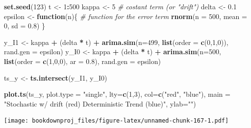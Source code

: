 \documentclass[
]{article}
\newenvironment{Shaded}{\begin{snugshade}}{\end{snugshade}}
\newcommand{\CommentTok}[1]{\textcolor[rgb]{0.56,0.35,0.01}{\textit{#1}}}
\newcommand{\ControlFlowTok}[1]{\textcolor[rgb]{0.13,0.29,0.53}{\textbf{#1}}}
\newcommand{\DataTypeTok}[1]{\textcolor[rgb]{0.13,0.29,0.53}{#1}}
\newcommand{\DecValTok}[1]{\textcolor[rgb]{0.00,0.00,0.81}{#1}}
\newcommand{\FloatTok}[1]{\textcolor[rgb]{0.00,0.00,0.81}{#1}}
\newcommand{\KeywordTok}[1]{\textcolor[rgb]{0.13,0.29,0.53}{\textbf{#1}}}
\newcommand{\NormalTok}[1]{#1}
\newcommand{\OperatorTok}[1]{\textcolor[rgb]{0.81,0.36,0.00}{\textbf{#1}}}
\newcommand{\StringTok}[1]{\textcolor[rgb]{0.31,0.60,0.02}{#1}}
\begin{document}
\begin{Shaded}
\begin{Highlighting}[]
\KeywordTok{set.seed}\NormalTok{(}\DecValTok{123}\NormalTok{)}
\NormalTok{t <-}\StringTok{ }\DecValTok{1}\OperatorTok{:}\DecValTok{500} 
\NormalTok{kappa <-}\StringTok{ }\DecValTok{5} \CommentTok{# costant term (or "drift")}
\NormalTok{delta <-}\StringTok{ }\FloatTok{0.1} 
\NormalTok{epsilon <-}\StringTok{ }\ControlFlowTok{function}\NormalTok{(n)\{ }\CommentTok{# function for the error term}
    \KeywordTok{rnorm}\NormalTok{(}\DataTypeTok{n =} \DecValTok{500}\NormalTok{, }\DataTypeTok{mean =} \DecValTok{0}\NormalTok{, }\DataTypeTok{sd =} \FloatTok{0.8}\NormalTok{)}
\NormalTok{    \} }

\NormalTok{y_I1 <-}\StringTok{ }\NormalTok{kappa }\OperatorTok{+}\StringTok{ }\NormalTok{(delta }\OperatorTok{*}\StringTok{ }\NormalTok{t) }\OperatorTok{+}\StringTok{ }\KeywordTok{arima.sim}\NormalTok{(}\DataTypeTok{n=}\DecValTok{499}\NormalTok{, }\KeywordTok{list}\NormalTok{(}\DataTypeTok{order =} \KeywordTok{c}\NormalTok{(}\DecValTok{0}\NormalTok{,}\DecValTok{1}\NormalTok{,}\DecValTok{0}\NormalTok{)), }
                                        \DataTypeTok{rand.gen =}\NormalTok{ epsilon)}
\NormalTok{y_I0 <-}\StringTok{ }\NormalTok{kappa }\OperatorTok{+}\StringTok{ }\NormalTok{(delta }\OperatorTok{*}\StringTok{ }\NormalTok{t) }\OperatorTok{+}\StringTok{ }\KeywordTok{arima.sim}\NormalTok{(}\DataTypeTok{n=}\DecValTok{500}\NormalTok{, }\KeywordTok{list}\NormalTok{(}\DataTypeTok{order =} \KeywordTok{c}\NormalTok{(}\DecValTok{1}\NormalTok{,}\DecValTok{0}\NormalTok{,}\DecValTok{0}\NormalTok{), }\DataTypeTok{ar =} \FloatTok{0.8}\NormalTok{),}
                                        \DataTypeTok{rand.gen =}\NormalTok{ epsilon)}

\NormalTok{ts_y <-}\StringTok{ }\KeywordTok{ts.intersect}\NormalTok{(y_I1, y_I0)}

\KeywordTok{plot.ts}\NormalTok{(ts_y, }\DataTypeTok{plot.type =} \StringTok{"single"}\NormalTok{, }
        \DataTypeTok{lty=}\KeywordTok{c}\NormalTok{(}\DecValTok{1}\NormalTok{,}\DecValTok{3}\NormalTok{), }\DataTypeTok{col=}\KeywordTok{c}\NormalTok{(}\StringTok{"red"}\NormalTok{, }\StringTok{"blue"}\NormalTok{),}
        \DataTypeTok{main =} \StringTok{"Stochastic w/ drift (red) Deterministic Trend (blue)"}\NormalTok{,}
        \DataTypeTok{ylab=}\StringTok{""}\NormalTok{)}
\end{Highlighting}
\end{Shaded}

\texttt{[image: bookdownproj\_files/figure-latex/unnamed-chunk-167-1.pdf]}
\end{document}
